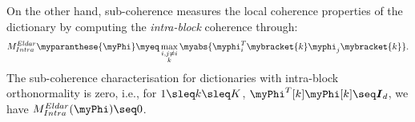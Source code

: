 On the other hand, sub-coherence measures the local coherence properties of the dictionary by computing the \emph{intra-block} coherence through:
\begin{equation}
\label{eq:Eldar-Sub-coherence}
M^{Eldar}_{Intra}\myparanthese{\myPhi} \myeq \displaystyle\max_{\substack{i,j \neq i \\ k}} \myabs{\myphi_i ^T \mybracket{k} \myphi_j \mybracket{k}}.
\end{equation}
The sub-coherence characterisation for dictionaries with intra-block orthonormality is zero, i.e., for $1 \sleq k \sleq K$, $\myPhi^T[k] \myPhi[k] \seq \boldsymbol{I}_d$, we have $M^{Eldar}_{Intra}(\myPhi) \seq 0$.